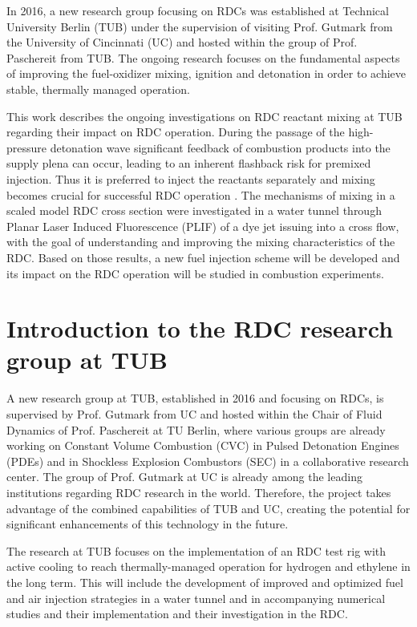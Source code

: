 \documentclass[]{aiaa-tc}%
\begin{document}
In 2016, a new research group focusing on RDCs was established at Technical University Berlin (TUB) under the supervision of visiting Prof. Gutmark from the University of Cincinnati (UC) and hosted within the group of Prof. Paschereit from TUB. The ongoing research focuses on the fundamental aspects of improving the fuel-oxidizer mixing, ignition and detonation in order to achieve stable, thermally managed operation. 

This work describes the ongoing investigations on RDC reactant mixing at TUB regarding their impact on RDC operation. During the passage of the high-pressure detonation wave significant feedback of combustion products into the supply plena can occur, leading to an inherent flashback risk for premixed injection. Thus it is preferred to inject the reactants separately and mixing becomes crucial for successful RDC operation \cite{Nordeen2015, Driscoll2016}. The mechanisms of mixing in a scaled model RDC cross section were investigated in a water tunnel through Planar Laser Induced Fluorescence (PLIF) of a dye jet issuing into a cross flow, with the goal of understanding and improving the mixing characteristics of the RDC. Based on those results, a new fuel injection scheme will be developed and its impact on the RDC operation will be studied in combustion experiments. 


\section{Introduction to the RDC research group at TUB}
A new research group at TUB, established in 2016 and focusing on RDCs, is supervised by Prof. Gutmark from UC and hosted within the Chair of Fluid Dynamics of Prof. Paschereit at TU Berlin, where various groups are already working on Constant Volume Combustion (CVC) in Pulsed Detonation Engines (PDEs) and in Shockless Explosion Combustors (SEC) in a collaborative research center. The group of Prof. Gutmark at UC is already among the leading institutions regarding RDC research in the world. Therefore, the project takes advantage of the combined capabilities of TUB and UC, creating the potential for significant enhancements of this technology in the future.

The research at TUB focuses on the implementation of an RDC test rig with active cooling to reach thermally-managed operation for hydrogen and ethylene in the long term. This will include the development of improved and optimized fuel and air injection strategies in a water tunnel and in accompanying numerical studies and their implementation and their investigation in the RDC.
\end{document}
